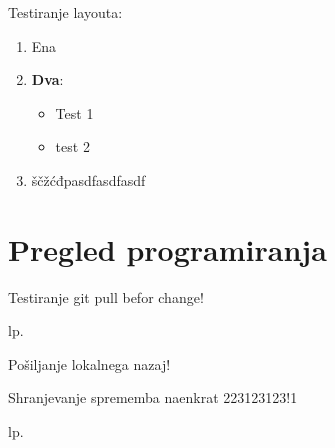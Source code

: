
Testiranje layouta:

\begin{enumerate}
\item Ena
\item \textbf{Dva}:
  \begin{itemize}[style]
  \item Test 1
  \item test 2
  \end{itemize}
\item ščžćđpasdfasdfasdf
\end{enumerate}

\chapter{Pregled programiranja}
\label{chap:Pregled_programiranja}

Testiranje git pull befor change!

lp.

Pošiljanje lokalnega nazaj!


Shranjevanje sprememba naenkrat 223123123!1

lp.



